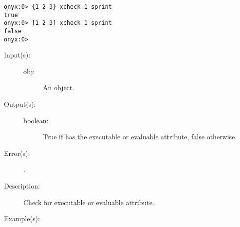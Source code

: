 \begin{description}
\begin{description}
\begin{verbatim}
onyx:0> {1 2 3} xcheck 1 sprint
true
onyx:0> [1 2 3] xcheck 1 sprint
false
onyx:0>
		\end{verbatim}
	\end{description}
\label{systemdict:xecheck}
\item[{\onyxop{obj}{xecheck}{boolean}}: ]
	\begin{description}\item[]
	\item[Input(s): ]
		\begin{description}\item[]
		\item[obj: ]
			An object.
		\end{description}
	\item[Output(s): ]
		\begin{description}\item[]
		\item[boolean: ]
			True if  has the executable or evaluable
			attribute, false otherwise.
		\end{description}
	\item[Error(s): ]
		\begin{description}\item[]
		\item[.]
		\end{description}
	\item[Description: ]
		Check  for executable or evaluable attribute.
	\item[Example(s): ]\begin{verbatim}


\end{verbatim}
\end{description}
\end{description}
